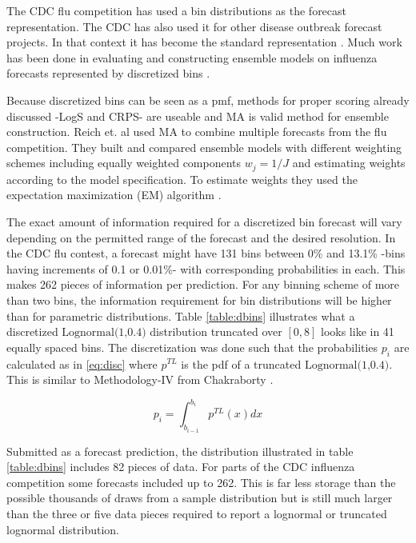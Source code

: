 \documentclass[11pt,notitlepage]{isuthesis}
\begin{document}
The CDC flu competition has used a bin distributions as the forecast 
representation. The CDC has also used it for other disease outbreak
forecast projects.
In that context it has become the standard representation 
\cite[]{brooks2020comparing}. Much work has been done in evaluating 
and constructing ensemble models on influenza forecasts represented by 
discretized bins 
\cite[]{mcgowan2019collaborative, mcandrew2019adaptively,reich2019collaborative}. 

Because discretized bins can be seen as a pmf, methods for proper scoring 
already 
discussed -LogS and CRPS- are useable and MA is valid method for ensemble 
construction. Reich et. al used MA to combine multiple forecasts from the flu 
competition. They built and compared ensemble models with different weighting
schemes including equally weighted components $w_j = 1/J$ and estimating weights
according to the model specification. To estimate weights they used the 
expectation maximization (EM) algorithm 
\cite[see
supplementary material within for details]{reich2019accuracy}.

The exact amount of information required for a discretized bin forecast will 
vary depending on the permitted range of the forecast and the desired 
resolution. 
In the CDC flu contest, a forecast might have 131 bins between 0\% and 13.1\% 
-bins having increments of 0.1 or 0.01\%- with 
corresponding probabilities in each. This makes 262 pieces of information per
prediction. For any binning scheme of more than two bins, the information 
requirement for bin distributions will be higher than for parametric 
distributions.
Table \ref{table:dbins} illustrates what a discretized 
$\mbox{Lognormal(1,0.4)}$ distribution truncated over $[0,8]$
looks like in 41 equally spaced bins. The discretization was done
such that the probabilities $p_i$ are calculated as in \eqref{eq:disc}
where $p^{TL}$ is the pdf of a truncated $\mbox{Lognormal(1,0.4)}$. This is 
similar
to Methodology-IV from Chakraborty 
\cite[]{chakraborty2015generating,kemp2004classes}.

\begin{equation}
\label{eq:disc}
  p_i = \int_{b_{i-1}}^{b_i} p^{TL}(x) dx
\end{equation}


Submitted as a forecast prediction, the distribution illustrated in table 
\ref{table:dbins} 
includes 82 pieces of data. For parts 
of the CDC influenza competition some forecasts included up to 262. This is 
far less storage than the possible thousands of draws from a sample 
distribution but is 
still much larger than the three or five data pieces required to report a 
lognormal
or truncated lognormal distribution.
\end{document}
